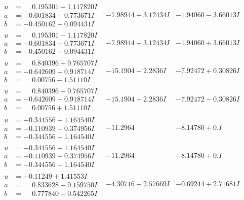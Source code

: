 \documentclass[1p]{elsarticle_modified}
\theoremstyle{definition}
\begin{document}
$$\begin{array}{c|c|c}
\begin{aligned}
u &= \phantom{-}0.195301 + 1.117820 I \\
a &= -0.601834 + 0.773671 I \\
b &= -0.450162 - 0.094431 I\end{aligned}
 & -7.98944 + 3.12434 I & -1.94060 - 3.66013 I \\ \hline\begin{aligned}
u &= \phantom{-}0.195301 - 1.117820 I \\
a &= -0.601834 - 0.773671 I \\
b &= -0.450162 + 0.094431 I\end{aligned}
 & -7.98944 - 3.12434 I & -1.94060 + 3.66013 I \\ \hline\begin{aligned}
u &= \phantom{-}0.840396 + 0.765707 I \\
a &= -0.642609 - 0.918714 I \\
b &= \phantom{-}0.00756 - 1.51110 I\end{aligned}
 & -15.1904 - 2.2836 I & -7.92472 + 0.30826 I \\ \hline\begin{aligned}
u &= \phantom{-}0.840396 - 0.765707 I \\
a &= -0.642609 + 0.918714 I \\
b &= \phantom{-}0.00756 + 1.51110 I\end{aligned}
 & -15.1904 + 2.2836 I & -7.92472 - 0.30826 I \\ \hline\begin{aligned}
u &= -0.344556 + 1.164540 I \\
a &= -0.110939 - 0.374956 I \\
b &= -0.344556 - 1.164540 I\end{aligned}
 & -11.2964\phantom{ +0.000000I} & -8.14780 + 0. I\phantom{ +0.000000I} \\ \hline\begin{aligned}
u &= -0.344556 - 1.164540 I \\
a &= -0.110939 + 0.374956 I \\
b &= -0.344556 + 1.164540 I\end{aligned}
 & -11.2964\phantom{ +0.000000I} & -8.14780 + 0. I\phantom{ +0.000000I} \\ \hline\begin{aligned}
u &= -0.11249 + 1.41553 I \\
a &= \phantom{-}0.833628 + 0.159750 I \\
b &= \phantom{-}0.777840 - 0.542265 I\end{aligned}
 & -4.30716 - 2.57669 I & -0.69244 + 2.71681 I \\ \hline\begin{aligned}

\end{aligned}
\end{array}$$
\end{document}
